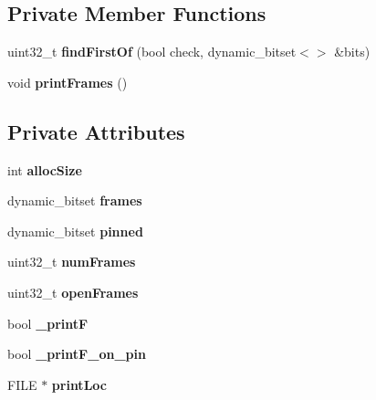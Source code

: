 \subsection*{\-Private \-Member \-Functions}
\begin{DoxyCompactItemize}
\item 
\hypertarget{classcFixedAlloc_ad7bb774118a2d337f8f5f950c22b7ee0}{uint32\-\_\-t {\bfseries find\-First\-Of} (bool check, dynamic\-\_\-bitset$<$$>$ \&bits)}\label{d1/d40/classcFixedAlloc_ad7bb774118a2d337f8f5f950c22b7ee0}

\item 
\hypertarget{classcFixedAlloc_a14dda43745a14f32f5e01b37797ac879}{void {\bfseries print\-Frames} ()}\label{d1/d40/classcFixedAlloc_a14dda43745a14f32f5e01b37797ac879}

\end{DoxyCompactItemize}
\subsection*{\-Private \-Attributes}
\begin{DoxyCompactItemize}
\item 
\hypertarget{classcFixedAlloc_aaf24339f1c79274e4d24fb1044d6ed25}{int {\bfseries alloc\-Size}}\label{d1/d40/classcFixedAlloc_aaf24339f1c79274e4d24fb1044d6ed25}

\item 
\hypertarget{classcFixedAlloc_a7df629e87072fd179c7e7934d2424815}{dynamic\-\_\-bitset {\bfseries frames}}\label{d1/d40/classcFixedAlloc_a7df629e87072fd179c7e7934d2424815}

\item 
\hypertarget{classcFixedAlloc_a09c47ddabbcc2e8f8708c929fefff05b}{dynamic\-\_\-bitset {\bfseries pinned}}\label{d1/d40/classcFixedAlloc_a09c47ddabbcc2e8f8708c929fefff05b}

\item 
\hypertarget{classcFixedAlloc_a369c2714b4308ef100b81195ead0b24a}{uint32\-\_\-t {\bfseries num\-Frames}}\label{d1/d40/classcFixedAlloc_a369c2714b4308ef100b81195ead0b24a}

\item 
\hypertarget{classcFixedAlloc_aed0c422265af0f1c248c6a5f4b6336d9}{uint32\-\_\-t {\bfseries open\-Frames}}\label{d1/d40/classcFixedAlloc_aed0c422265af0f1c248c6a5f4b6336d9}

\item 
\hypertarget{classcFixedAlloc_aeb96768ba92b2d27f3c736fed35076e2}{bool {\bfseries \-\_\-print\-F}}\label{d1/d40/classcFixedAlloc_aeb96768ba92b2d27f3c736fed35076e2}

\item 
\hypertarget{classcFixedAlloc_a619d729276b056675bc582b406f5d385}{bool {\bfseries \-\_\-print\-F\-\_\-on\-\_\-pin}}\label{d1/d40/classcFixedAlloc_a619d729276b056675bc582b406f5d385}

\item 
\hypertarget{classcFixedAlloc_ad953ea8614b03e098d3e46a6087e15ba}{\-F\-I\-L\-E $\ast$ {\bfseries print\-Loc}}\label{d1/d40/classcFixedAlloc_ad953ea8614b03e098d3e46a6087e15ba}

\end{DoxyCompactItemize}


